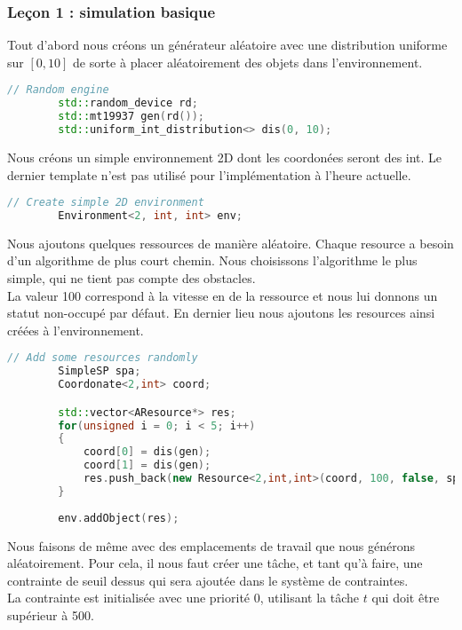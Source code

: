 \subsubsection{Leçon 1 : simulation basique}

Tout d'abord nous créons un générateur aléatoire avec une distribution uniforme sur $[0,10]$ de sorte à placer aléatoirement des objets dans l'environnement.

\begin{lstlisting}[label=nvi_code,caption=Générateur aléatoire,language=C++]
        // Random engine
        std::random_device rd;
        std::mt19937 gen(rd());
        std::uniform_int_distribution<> dis(0, 10);
\end{lstlisting}

Nous créons un simple environnement 2D dont les coordonées seront des int. Le dernier template n'est pas utilisé pour l'implémentation à l'heure actuelle.

\begin{lstlisting}[label=nvi_code,caption=Environnement,language=C++]
        // Create simple 2D environment
        Environment<2, int, int> env;
\end{lstlisting}

Nous ajoutons quelques ressources de manière aléatoire. Chaque resource a besoin d'un algorithme de plus court chemin. Nous choisissons l'algorithme le plus simple, qui ne tient pas compte des obstacles.\\
La valeur 100 correspond à la vitesse en de la ressource et nous lui donnons un statut non-occupé par défaut. En dernier lieu nous ajoutons les resources ainsi créées à l'environnement.

\begin{lstlisting}[label=nvi_code,caption=Création de ressources,language=C++]       
        // Add some resources randomly
        SimpleSP spa;
        Coordonate<2,int> coord;

        std::vector<AResource*> res;
        for(unsigned i = 0; i < 5; i++)
        {
            coord[0] = dis(gen);
            coord[1] = dis(gen);
            res.push_back(new Resource<2,int,int>(coord, 100, false, spa));
        }
        
        env.addObject(res);
\end{lstlisting}

Nous faisons de même avec des emplacements de travail que nous générons aléatoirement. Pour cela, il nous faut créer une tâche, et tant qu'à faire, une contrainte de seuil dessus qui sera ajoutée dans le système de contraintes.\\
La contrainte est initialisée avec une priorité 0, utilisant la tâche $t$ qui doit être supérieur à 500.

